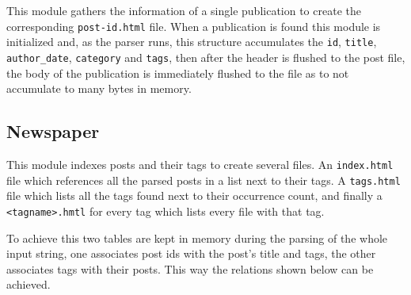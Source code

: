 \documentclass[a4paper]{article}
\begin{document}
This module gathers the information of a single publication to create the
corresponding \texttt{post-id.html} file. When a publication is found this
module is initialized and, as the parser runs, this structure accumulates the
\texttt{id}, \texttt{title}, \texttt{author\_date}, \texttt{category} and
\texttt{tags}, then after the header is flushed to the post file, the body of
the publication is immediately flushed to the file as to not accumulate to many
bytes in memory.

\subsection{Newspaper}

This module indexes posts and their tags to create several files. An
\texttt{index.html} file which references all the parsed posts in a list next
to their tags. A \texttt{tags.html} file which lists all the tags found next to
their occurrence count, and finally a \texttt{<tagname>.hmtl} for every tag
which lists every file with that tag.

To achieve this two tables are kept in memory during the parsing of the whole
input string, one associates post ids with the post's title and tags, the other
associates tags with their posts. This way the relations shown below can be
achieved.
\end{document}
